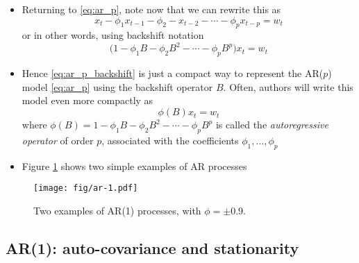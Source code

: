 \documentclass{article}
\begin{document}
\begin{itemize}
\item Returning to \eqref{eq:ar_p}, note now that we can rewrite this as 
  \[
  x_t - \phi_1 x_{t-1} - \phi_2 - x_{t-2} - \cdots - \phi_p x_{t-p} = w_t  
  \]
  or in other words, using backshift notation 
  \begin{equation}
  \label{eq:ar_p_backshift}
  \Big(1 - \phi_1 B - \phi_2 B^2 - \cdots - \phi_p B^p \Big) x_t = w_t 
  \end{equation}

\item Hence \eqref{eq:ar_p_backshift} is just a compact way to represent the
  AR($p$) model \eqref{eq:ar_p} using the backshift operator $B$. Often, authors
  will write this model even more compactly as  
  \begin{equation}
  \label{eq:ar_p_operator}
  \phi(B) x_t = w_t 
  \end{equation}
  where $\phi(B) = 1 - \phi_1 B - \phi_2 B^2 - \cdots - \phi_p B^p$ is called
  the \emph{autoregressive operator} of order $p$, associated with the
  coefficients $\phi_1,\dots,\phi_p$

\item Figure \ref{fig:ar} shows two simple examples of AR processes
\end{itemize}

\begin{figure}[htb]
\centering
\texttt{[image: fig/ar-1.pdf]}
\caption{Two examples of AR(1) processes, with $\phi = \pm 0.9$.}
\label{fig:ar}
\end{figure}

\subsection{AR(1): auto-covariance and stationarity}
\end{document}
